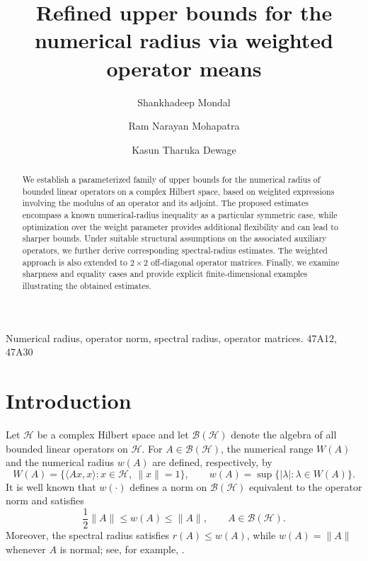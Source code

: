 \documentclass[final,1p,times]{elsarticle}
\newcommand{\BH}{\mathcal{B}(\mathcal{H})}
\begin{document}
	\begin{frontmatter}
	
		\title{  Refined upper bounds for the numerical radius via weighted operator means}
		\author{Shankhadeep Mondal}
		\author{Ram Narayan Mohapatra}
        \author{Kasun Tharuka Dewage}
		
		
		\address{School of Mathematics, University of Central Florida, Orlando, Florida-32816}
		
\begin{abstract}
We establish a parameterized family of upper bounds for the numerical radius of bounded linear operators on a complex Hilbert space, based on weighted expressions involving the modulus of an operator and its adjoint. The proposed estimates encompass a known numerical-radius inequality as a particular symmetric case, while optimization over the weight parameter provides additional flexibility and can lead to sharper bounds. Under suitable structural assumptions on the associated auxiliary operators, we further derive corresponding spectral-radius estimates. The weighted approach is also extended to $2\times2$ off-diagonal operator matrices. Finally, we examine sharpness and
equality cases and provide explicit finite-dimensional examples
illustrating the obtained estimates.
\end{abstract}
		
		
		
		
		
		\begin{keyword}
			Numerical radius, operator norm, spectral radius, operator matrices.
			\MSC[2010] 47A12, 47A30
		\end{keyword}
		
	\end{frontmatter}
	
\section{Introduction}

Let $\mathcal H$ be a complex Hilbert space and let $\BH$ denote the algebra
of all bounded linear operators on $\mathcal H$. For $A\in\BH$, the numerical
range $W(A)$ and the numerical radius $w(A)$ are defined, respectively, by
\[
W(A)=\{\langle Ax,x\rangle:x\in\mathcal H,\ \|x\|=1\},
\qquad
w(A)=\sup\{|\lambda|:\lambda\in W(A)\}.
\]
It is well known that $w(\cdot)$ defines a norm on $\BH$ equivalent to the
operator norm and satisfies
\begin{equation}\label{eq:basic}
\frac12\|A\|\leq w(A)\leq\|A\|,
\qquad A\in\BH.
\end{equation}
Moreover, the spectral radius satisfies $r(A)\leq w(A)$, while
$w(A)=\|A\|$ whenever $A$ is normal; see, for example,
\cite{HornJohnson}.
\end{document}

